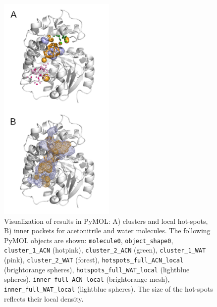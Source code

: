 \documentclass[9pt,tutorial]{livecoms}
\begin{document}
\begin{figure}[ht!]
\centering
\includegraphics[width=0.5\textwidth]{Tut6.3.png}
\caption{Visualization of results in PyMOL: A) clusters and local hot-spots, B) inner pockets for acetonitrile and water molecules. The following PyMOL objects are shown: \texttt{molecule0}, \texttt{object\_shape0}, \texttt{cluster\_1\_ACN} (hotpink), \texttt{cluster\_2\_ACN} (green), \texttt{cluster\_1\_WAT} (pink), \texttt{cluster\_2\_WAT} (forest), \texttt{hotspots\_full\_ACN\_local} (brightorange spheres), \texttt{hotspots\_full\_WAT\_local} (lightblue spheres), \texttt{inner\_full\_ACN\_local} (brightorange mesh), \texttt{inner\_full\_WAT\_local} (lightblue spheres). The size of the hot-spots reflects their local density.}
\label{Tut6.3}
\end{figure}
\end{document}
